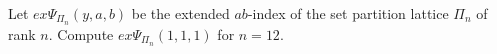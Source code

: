 Let $ex\Psi_{\Pi_n}(y,a,b)$ be the extended $ab$-index of the set partition lattice $\Pi_n$ of rank $n$.
Compute $ex\Psi_{\Pi_n}(1,1,1)$ for $n=12$.

